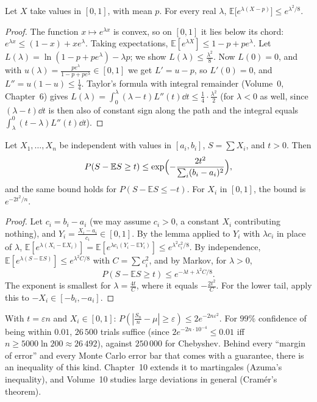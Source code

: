 \begin{lemma}[Hoeffding]\label{lem:hoeffding}
Let $X$ take values in $[0,1]$, with mean $p$. For every real $\lambda$, $\mathbb E\bigl[e^{\lambda(X-p)}\bigr]\le e^{\lambda^2/8}$.
\end{lemma}
\begin{proof}
The function $x\mapsto e^{\lambda x}$ is convex, so on $[0,1]$ it lies below its chord: $e^{\lambda x}\le(1-x)+xe^\lambda$. Taking expectations,
$\mathbb E[e^{\lambda X}]\le1-p+pe^\lambda$. Let $L(\lambda)=\ln(1-p+pe^\lambda)-\lambda p$; we show $L(\lambda)\le\frac{\lambda^2}8$. Now $L(0)=0$, and with
$u(\lambda)=\frac{pe^\lambda}{1-p+pe^\lambda}\in[0,1]$ we get $L'=u-p$, so $L'(0)=0$, and $L''=u(1-u)\le\frac14$. Taylor's formula with integral remainder (Volume~0,
Chapter~6) gives $L(\lambda)=\int_0^\lambda(\lambda-t)L''(t)\dd t\le\frac14\cdot\frac{\lambda^2}2$ (for $\lambda<0$ as well, since $(\lambda-t)\dd t$ is then also of
constant sign along the path and the integral equals $\int_\lambda^0(t-\lambda)L''(t)\dd t$).
\end{proof}

\begin{theorem}\label{thm:hoeffding}
Let $X_1,\dots,X_n$ be independent with values in $[a_i,b_i]$, $S=\sum X_i$, and $t>0$. Then
\[
P(S-\mathbb ES\ge t)\le\exp\Bigl(-\frac{2t^2}{\sum_i(b_i-a_i)^2}\Bigr),
\]
and the same bound holds for $P(S-\mathbb ES\le-t)$. For $X_i$ in $[0,1]$, the bound is $e^{-2t^2/n}$.
\end{theorem}
\begin{proof}
Let $c_i=b_i-a_i$ (we may assume $c_i>0$, a constant $X_i$ contributing nothing), and $Y_i=\frac{X_i-a_i}{c_i}\in[0,1]$. By the lemma applied to
$Y_i$ with $\lambda c_i$ in place of $\lambda$, $\mathbb E[e^{\lambda(X_i-\mathbb EX_i)}]=\mathbb E[e^{\lambda c_i(Y_i-\mathbb EY_i)}]\le e^{\lambda^2c_i^2/8}$. By independence,
$\mathbb E[e^{\lambda(S-\mathbb ES)}]\le e^{\lambda^2C/8}$ with $C=\sum c_i^2$, and by Markov, for $\lambda>0$,
\[
P(S-\mathbb ES\ge t)\le e^{-\lambda t+\lambda^2C/8}.
\]
The exponent is smallest for $\lambda=\frac{4t}C$, where it equals $-\frac{2t^2}C$. For the lower tail, apply this to $-X_i\in[-b_i,-a_i]$.
\end{proof}

With $t=\varepsilon n$ and $X_i\in[0,1]$: $P(|\frac{S_n}n-\mu|\ge\varepsilon)\le2e^{-2n\varepsilon^2}$. For $99\%$ confidence of being within $0.01$, $26\,500$ trials suffice
(since $2e^{-2n\cdot10^{-4}}\le0.01$ iff $n\ge5000\ln200\approx26\,492$), against $250\,000$ for Chebyshev. Behind every
``margin of error'' and every Monte Carlo error bar that comes with a guarantee, there is an inequality of this kind. Chapter~10 extends it to martingales
(Azuma's inequality), and Volume~10 studies large deviations in general (Cram\'er's theorem).

